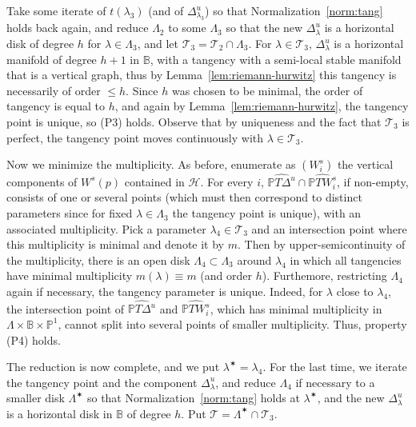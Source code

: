 \documentclass[11pt, oneside]{amsart}
\newcommand{\B}{\mathbb{B}}
\renewcommand{\P}{\mathbb{P}}
\theoremstyle{remark}
\theoremstyle{definition}
\theoremstyle{theorem}
\newcommand{\commentaire}[1]{}
\begin{document}
Take some iterate of $t(\lambda_3)$ (and of $\Delta^u_{\lambda_3}$) so that Normalization~\ref{norm:tang} holds back again, and reduce $\Lambda_2$ to some $\Lambda_3$ so that the new
$\Delta^u_\lambda$ is a horizontal disk of degree $h$ for $\lambda\in \Lambda_3$, 
and let $\mathcal T_3 = \mathcal T_2\cap \Lambda_3$. 
 For $\lambda\in \mathcal T_3$, $\Delta^u_\lambda$ is a horizontal manifold of degree 
 $h+1$ in  $\B$, with a tangency with a semi-local stable manifold that  is a
  vertical graph, 
 thus by Lemma~\ref{lem:riemann-hurwitz}
this tangency is necessarily of order 
 $\leq h$. Since $h$ was chosen to be minimal, the order of tangency 
 is equal to $h$, 
 and again by  Lemma~\ref{lem:riemann-hurwitz}, the tangency point is unique, so (P3) holds. 
Observe that by uniqueness and the fact that $\mathcal T_3$ is perfect, 
the tangency point  moves continuously 
 with $\lambda\in \mathcal T_3$. 
 
 Now we minimize the multiplicity. As before, enumerate as $(W^s_i)$ the vertical 
 components of $W^s(p)$ contained in $\mathcal H$. For every   $i$, 
 $\widehat{\P T\Delta^u}\cap \widehat{\P T W^s_i}$, if non-empty,  consists of  one or several points 
 (which must then correspond to  distinct parameters since for fixed
  $\lambda\in\Lambda_3$ the tangency point is unique), 
 with an associated multiplicity. Pick a parameter $\lambda_4\in \mathcal T_3$
 and an intersection point where this multiplicity is minimal and denote it by $m$.   
 Then by upper-semicontinuity of the  multiplicity,
  there is an open disk $\Lambda_4\subset \Lambda_3$ around $\lambda_4$ in which 
 all tangencies  have minimal multiplicity $m(\lambda)\equiv m$ (and order $h$). 
 Furthemore, restricting $\Lambda_4$ again if necessary, the tangency 
 parameter is unique\commentaire{cf. Minor comment \#5}. Indeed, for $\lambda$ close to $\lambda_4$, the intersection point of $\widehat{\P T\Delta^u}$ and  $\widehat{\P T W^s_i}$, which has 
  minimal multiplicity in $\Lambda\times \B\times \P^1$, cannot split into several points of smaller multiplicity. Thus, property (P4) holds. 
 
The reduction is now complete, and we   put $\lambda^\varstar = \lambda_4$. 
 For the last time, we iterate the tangency point and the component $\Delta^u_\lambda$, 
  and  reduce $\Lambda_4$ if necessary to a smaller disk $\Lambda^\varstar$ 
 so that Normalization~\ref{norm:tang} holds at $\lambda^\varstar$, 
and  the new $\Delta^u_\lambda$ is a horizontal disk in $\B$ of degree $h$. Put $\mathcal T = \Lambda^\varstar\cap \mathcal T_3$. 
 
\end{document}
